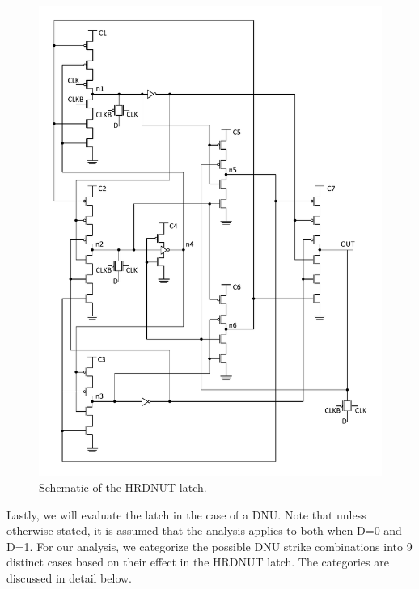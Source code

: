 \begin{figure}[!tbp]
	\centering
	\includegraphics[width=\linewidth]{Figures/HRDNUT}
	\caption{Schematic of the HRDNUT latch.}
	\label{HRDNUT}
\end{figure} 

Lastly, we will evaluate the latch in the case of a DNU. Note that unless otherwise stated, it is assumed that the analysis applies to both when D=0 and D=1. For our analysis, we categorize the possible DNU strike combinations into 9 distinct cases based on their effect in the HRDNUT latch. The categories are discussed in detail below. 

